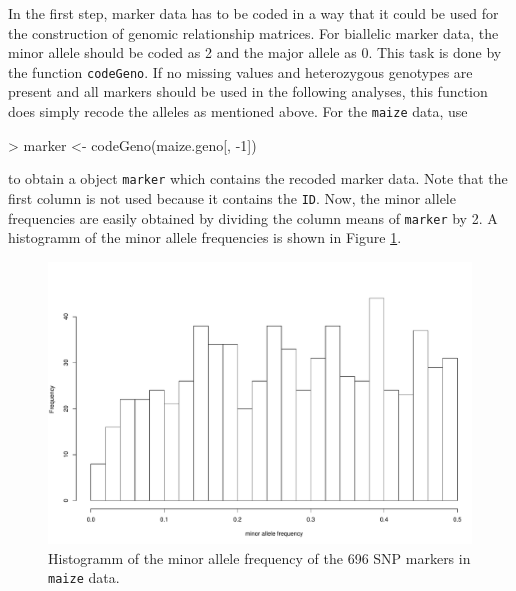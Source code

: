 \documentclass[a4paper,11pt]{article}
\begin{document}
In the first step, marker data has to be coded in a way that it could be used for the construction of genomic relationship matrices. For biallelic marker data, the minor allele should be coded as 2 and the major allele as 0.
This task is done by the function \texttt{codeGeno}. If no missing values and heterozygous genotypes are present 
and all markers should be used in the following analyses, this function does simply recode the alleles as mentioned above.
For the \texttt{maize} data, use
\begin{Schunk}
\begin{Sinput}
> marker <- codeGeno(maize.geno[, -1])
\end{Sinput}
\end{Schunk}
to obtain a object \texttt{marker} which contains the recoded marker data. 
Note that the first column is not used because it contains the \texttt{ID}. 
Now, the minor allele frequencies are easily obtained by dividing the column means of \texttt{marker} by 2. 
A histogramm of the minor allele frequencies is shown in Figure \ref{fig:histmaf}.

\begin{figure}[h]
\centering
\includegraphics{figs/vignette-004}
\caption{Histogramm of the minor allele frequency of the 696 SNP markers in \texttt{maize} data.}
\label{fig:histmaf}
\end{figure}
\end{document}
